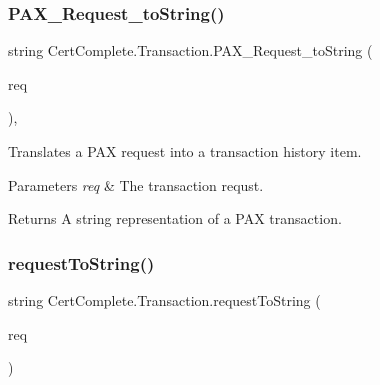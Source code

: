 \mbox{\label{class_cert_complete_1_1_transaction_a2c329cf1cedbc043c8b419774fab7a7a}} 
\subsubsection{\texorpdfstring{P\+A\+X\+\_\+\+Request\+\_\+to\+String()}{PAX\_Request\_toString()}}
{\footnotesize\ttfamily string Cert\+Complete.\+Transaction.\+P\+A\+X\+\_\+\+Request\+\_\+to\+String (\begin{DoxyParamCaption}\item[{Newtonsoft.\+Json.\+Linq.\+J\+Token}]{req }\end{DoxyParamCaption})\hspace{0.3cm}{\ttfamily [inline]}, {\ttfamily [private]}}



Translates a P\+AX request into a transaction history item. 


\begin{DoxyParams}{Parameters}
{\em req} & The transaction requst.\\
\hline
\end{DoxyParams}
\begin{DoxyReturn}{Returns}
A string representation of a P\+AX transaction.
\end{DoxyReturn}
\mbox{\label{class_cert_complete_1_1_transaction_abda5b8ce085a80ebfe344248df2d7daf}} 
\subsubsection{\texorpdfstring{request\+To\+String()}{requestToString()}}
{\footnotesize\ttfamily string Cert\+Complete.\+Transaction.\+request\+To\+String (\begin{DoxyParamCaption}\item[{Newtonsoft.\+Json.\+Linq.\+J\+Token}]{req }\end{DoxyParamCaption})\hspace{0.3cm}{\ttfamily [inline]}}



